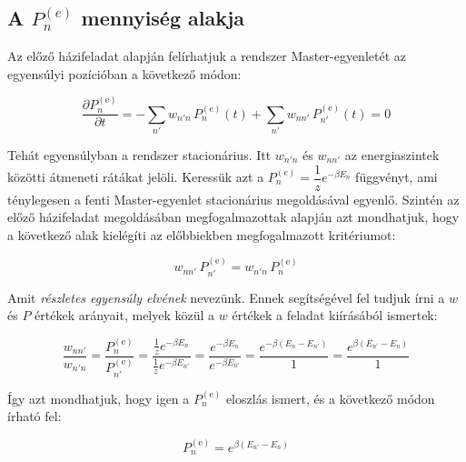 \subsection*{A $P_{n}^{\left( e \right)}$ mennyiség alakja}
Az előző házifeladat alapján\cite{hw3} felírhatjuk a rendszer Master-egyenletét az egyensúlyi pozícióban a következő módon:

\begin{equation}
    \frac{\partial P_{n}^{\left( \text{e} \right)}}{\partial t}
    =
    -
    \sum_{n'} w_{n'n}\,P_{n}^{\left( \text{e} \right)} \left( t \right)
    +
    \sum_{n'} w_{nn'}\,P_{n'}^{\left( \text{e} \right)} \left( t \right)
    =
    0
\end{equation}


Tehát egyensúlyban a rendszer stacionárius. Itt $w_{n'n}$ és $w_{nn'}$ az energiaszintek közötti átmeneti rátákat jelöli. Keressük azt a $P_{n}^{\left( e \right)} = \dfrac{1}{z} e^{- \beta E_{n}}$ függvényt, ami ténylegesen a fenti Master-egyenlet stacionárius megoldásával egyenlő. Szintén az előző házifeladat megoldásában\cite{hw3} megfogalmazottak alapján azt mondhatjuk, hogy a következő alak kielégíti az előbbiekben megfogalmazott kritériumot:

\begin{equation}
    w_{nn'}\,P_{n'}^{\left( \text{e} \right)}
    =
    w_{n'n}\,P_{n}^{\left( \text{e} \right)}
\end{equation}


Amit \emph{részletes egyensúly elvének} nevezünk. Ennek segítségével fel tudjuk írni a $w$ és $P$ értékek arányait, melyek közül a $w$ értékek a feladat kiírásából ismertek:

\begin{equation}
    \frac{w_{nn'}}{w_{n'n}}
    =
    \frac{P_{n}^{\left( \text{e} \right)}}{P_{n'}^{\left( \text{e} \right)}}
    =
    \frac{\frac{1}{z} e^{- \beta E_{n}}}{\frac{1}{z} e^{- \beta E_{n'}}}
    =
    \frac{e^{- \beta E_{n}}}{e^{- \beta E_{n'}}}
    =
    \frac{e^{- \beta \left( E_{n} - E_{n'} \right)}}{1}
    =
    \frac{e^{\beta \left( E_{n'} - E_{n} \right)}}{1}
\end{equation}


Így azt mondhatjuk, hogy igen a $P_{n}^{\left( \text{e} \right)}$ eloszlás ismert, és a következő módon írható fel:

\begin{equation}
    P_{n}^{\left( \text{e} \right)}
    =
    e^{\beta \left( E_{n'} - E_{n} \right)}
\end{equation}
